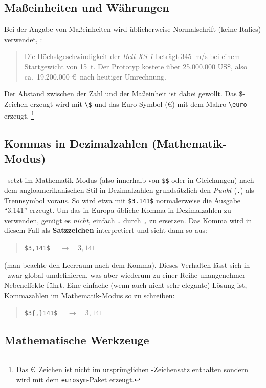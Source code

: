 \subsection{Maßeinheiten und Währungen}

Bei der Angabe von Maßeinheiten wird üblicherweise Normalschrift
(keine Italics) verwendet, \zB:
\begin{quote}
Die Höchstgeschwindigkeit der \textit{Bell XS-1} beträgt 345~m/s
bei einem Startgewicht von 15~t. 
Der Prototyp kostete über 25.000.000 US\$, also ca.\ 19.200.000 \euro\ nach heutiger Umrechnung.
\end{quote}
Der Abstand zwischen der Zahl und der Maßeinheit ist dabei
gewollt.
Das \$-Zeichen erzeugt wird mit \verb!\$! und
das Euro-Symbol (\euro) mit dem Makro \verb!\euro! erzeugt.%
\footnote{Das \euro\ Zeichen ist nicht im ursprünglichen \latex-Zeichensatz enthalten
sondern wird mit dem \texttt{eurosym}-Paket erzeugt.}


\subsection{Kommas in Dezimalzahlen (Mathematik-Modus)}

\latex\ setzt im Mathematik-Modus (also innerhalb von \verb!$$! oder in Gleichungen) nach dem angloamerikanischen Stil in Dezimalzahlen grundsätzlich den \emph{Punkt} (\verb!.!) als Trennsymbol voraus. So wird etwa mit \verb!$3.141$! normalerweise die Ausgabe "`3.141"' erzeugt. Um das in Europa übliche Komma in Dezimalzahlen zu verwenden, genügt es \emph{nicht}, einfach \verb!.! durch \verb!,! zu ersetzen. Das Komma wird in diesem Fall
als \textbf{Satzzeichen} interpretiert und sieht dann so aus:
\begin{quote}
\verb!$3,141$!	$\quad \rightarrow \quad 3,141$ 
\end{quote}
(man beachte den Leerraum nach dem Komma). Dieses Verhalten lässt sich in \latex\ zwar global umdefinieren, was aber wiederum zu einer Reihe unangenehmer Nebeneffekte führt. Eine einfache (wenn auch nicht sehr elegante) Lösung ist, Kommazahlen im Mathematik-Modus so zu schreiben:
\begin{quote}
\verb!$3{,}141$!	$\quad \rightarrow \quad 3{,}141$
\end{quote}



\subsection{Mathematische Werkzeuge}


